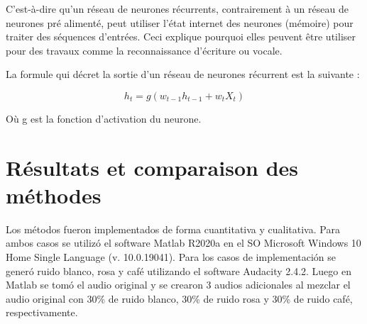 \documentclass[conference,onecolumn]{IEEEtran}
\begin{document}
C’est-à-dire qu'un réseau de neurones récurrents, contrairement à un réseau de neurones pré alimenté, peut utiliser l’état internet des neurones (mémoire) pour traiter des séquences d’entrées. Ceci explique pourquoi elles peuvent être utiliser pour des travaux comme la reconnaissance d’écriture ou vocale. 

La formule qui décret la sortie d’un réseau de neurones récurrent est la suivante :

\begin{equation}
    h_t = g(w_{t-1}h_{t-1} + w_tX_t) 
\end{equation}


Où g est la fonction d’activation du neurone.  


\clearpage %
\section{Résultats et comparaison des méthodes}
Los métodos fueron implementados de forma cuantitativa y cualitativa. Para ambos casos se utilizó el software Matlab R2020a en el SO Microsoft Windows 10 Home Single Language (v. 10.0.19041). Para los casos de implementación se generó ruido blanco, rosa y café utilizando el software Audacity 2.4.2. Luego en Matlab se tomó el audio original y se crearon 3 audios adicionales al mezclar el audio original con 30\% de ruido blanco, 30\% de ruido rosa y 30\% de ruido café, respectivamente.
\end{document}
